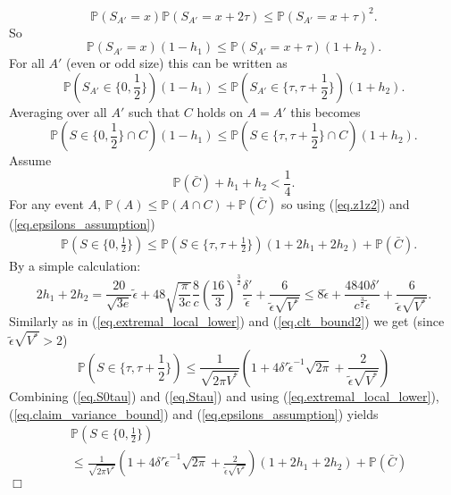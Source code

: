 \documentclass{article}
\newenvironment{proofof}[1]{\noindent {\bf Proof of #1}}{\hspace*{\fill}$\Box$}
\newcommand{\pr}{\mathbb P}
\begin{document}
\begin{proofof}{Lemma~\ref{lem.clt}}
\begin{equation}\label{eq.logconct}
        \pr(S_{A'} = x) \pr(S_{A'} = x + 2 \tau) \le \pr(S_{A'} = x + \tau)^2.
    \end{equation}
    So
    \[
        \pr(S_{A'} = x) (1-h_1) \le \pr(S_{A'} = x + \tau) (1+h_2).
    \]
    For all $A'$ (even or odd size)
    this can be written as
    \[
        \pr(S_{A'} \in \{0, \frac 1 2\}) (1-h_1) \le \pr(S_{A'} \in \{\tau, \tau + \frac 1 2\}) (1 + h_2).
    \]
    Averaging over all $A'$ such that $C$ holds on $A=A'$ this becomes
    \[
        \pr(S \in \{0, \frac 1 2\} \cap C) (1-h_1) \le \pr(S \in \{\tau, \tau + \frac 1 2\} \cap C) (1 + h_2).
    \]
Assume \begin{equation}\label{eq.epsilons_assumption}
\pr(\bar{C}) + h_1 + h_2 < \frac 1 4.
\end{equation}
    For any event $A$, $\pr(A) \le \pr(A \cap C) + \pr(\bar{C})$ so using (\ref{eq.z1z2}) and (\ref{eq.epsilons_assumption}) 
\begin{align}\label{eq.S0tau}
        &  \pr(S \in \{0, \frac 1 2\}) \le  \pr(S \in \{\tau, \tau + \frac 1 2\}) ( 1 + 2h_1 + 2h_2) + \pr(\bar{C}).
\end{align}
    By a simple calculation:
    \[
        2h_1 + 2 h_2 =\frac {20} {\sqrt {3 e} } \tilde{\epsilon} + 48 \sqrt{\frac {\pi} {3 c}} \frac 8 c 
\left(\frac {16} {3}\right)^{\frac 3 2} 
        \frac {\delta'} {\tilde{\epsilon}} + \frac 6 {\tilde{\epsilon} \sqrt{V^*}} \le 8 \tilde{\epsilon} + 
        \frac { 4840
\delta'} { c^{\frac 3 2} \tilde{\epsilon} } + \frac {6} {\tilde{\epsilon} \sqrt{V^*}}.
\]
    Similarly as in (\ref{eq.extremal_local_lower}) and (\ref{eq.clt_bound2}) we get (since $\tilde{\epsilon} \sqrt{V^*} > 2$)
    \begin{equation}\label{eq.Stau}
         \pr(S \in \{\tau, \tau+\frac 1 2\}) \le
        \frac 1 {\sqrt {2 \pi V^*}} \left(1  + {4 \delta'} {\tilde{\epsilon}}^{-1} \sqrt {2 \pi}  + \frac 2 {\tilde{\epsilon} \sqrt{V^*}} \right )
    \end{equation}
    Combining (\ref{eq.S0tau}) and (\ref{eq.Stau}) and using (\ref{eq.extremal_local_lower}), (\ref{eq.claim_variance_bound}) and (\ref{eq.epsilons_assumption}) yields
    \begin{align*}
        & \pr(S \in \{0, \frac 1 2\}) 
        \\ &
         \le \frac 1 {\sqrt {2 \pi V^*}} \left(1  + {4 \delta'} {\tilde{\epsilon}}^{-1} \sqrt {2 \pi} + \frac 2 {\tilde{\epsilon} \sqrt{V^*}} \right )
         ( 1 +  2h_1 + 2h_2) + \pr(\bar{C})

\end{align*}
\end{proofof}
\end{document}
